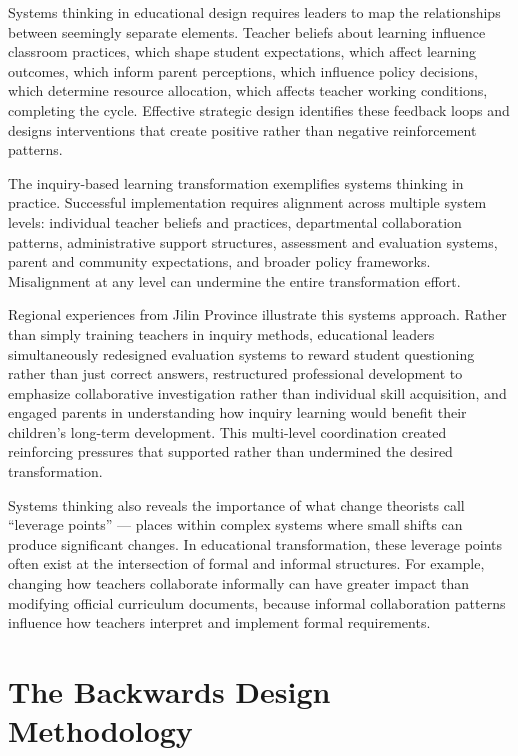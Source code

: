 \documentclass[
  Letterpaper,
]{scrbook}
\begin{document}
Systems thinking in educational design requires leaders to map the
relationships between seemingly separate elements. Teacher beliefs about
learning influence classroom practices, which shape student
expectations, which affect learning outcomes, which inform parent
perceptions, which influence policy decisions, which determine resource
allocation, which affects teacher working conditions, completing the
cycle. Effective strategic design identifies these feedback loops and
designs interventions that create positive rather than negative
reinforcement patterns.

The inquiry-based learning transformation exemplifies systems thinking
in practice. Successful implementation requires alignment across
multiple system levels: individual teacher beliefs and practices,
departmental collaboration patterns, administrative support structures,
assessment and evaluation systems, parent and community expectations,
and broader policy frameworks. Misalignment at any level can undermine
the entire transformation effort.

Regional experiences from Jilin Province illustrate this systems
approach. Rather than simply training teachers in inquiry methods,
educational leaders simultaneously redesigned evaluation systems to
reward student questioning rather than just correct answers,
restructured professional development to emphasize collaborative
investigation rather than individual skill acquisition, and engaged
parents in understanding how inquiry learning would benefit their
children's long-term development. This multi-level coordination created
reinforcing pressures that supported rather than undermined the desired
transformation.

Systems thinking also reveals the importance of what change theorists
call ``leverage points'' --- places within complex systems where small
shifts can produce significant changes. In educational transformation,
these leverage points often exist at the intersection of formal and
informal structures. For example, changing how teachers collaborate
informally can have greater impact than modifying official curriculum
documents, because informal collaboration patterns influence how
teachers interpret and implement formal requirements.

\section{The Backwards Design
Methodology}\label{the-backwards-design-methodology}
\end{document}

